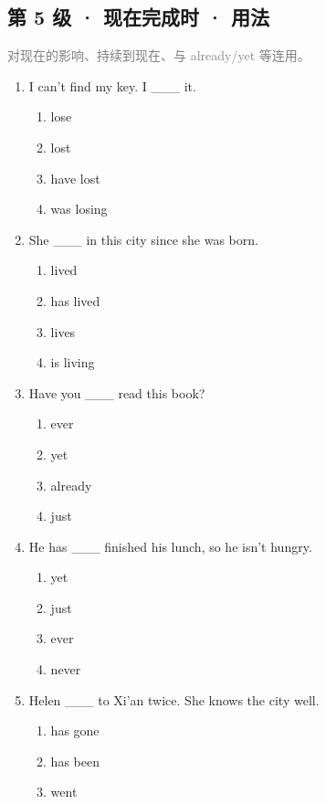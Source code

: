 \documentclass[11pt,a4paper]{ctexart}
\begin{document}
\subsection*{第 5 级 · 现在完成时 · 用法}
\noindent\textcolor{gray}{对现在的影响、持续到现在、与 already/yet 等连用。}\par\smallskip
\begin{enumerate}[leftmargin=*,itemsep=4pt]
\item I can’t find my key. I \_\_\_ it.
\begin{enumerate}[label=\Alph*.,leftmargin=2em,itemsep=1pt,topsep=2pt]
\item lose
\item lost
\item have lost
\item was losing
\end{enumerate}
\item She \_\_\_ in this city since she was born.
\begin{enumerate}[label=\Alph*.,leftmargin=2em,itemsep=1pt,topsep=2pt]
\item lived
\item has lived
\item lives
\item is living
\end{enumerate}
\item Have you \_\_\_ read this book?
\begin{enumerate}[label=\Alph*.,leftmargin=2em,itemsep=1pt,topsep=2pt]
\item ever
\item yet
\item already
\item just
\end{enumerate}
\item He has \_\_\_ finished his lunch, so he isn’t hungry.
\begin{enumerate}[label=\Alph*.,leftmargin=2em,itemsep=1pt,topsep=2pt]
\item yet
\item just
\item ever
\item never
\end{enumerate}
\item Helen \_\_\_ to Xi’an twice. She knows the city well.
\begin{enumerate}[label=\Alph*.,leftmargin=2em,itemsep=1pt,topsep=2pt]
\item has gone
\item has been
\item went

\end{enumerate}
\end{enumerate}
\end{document}
